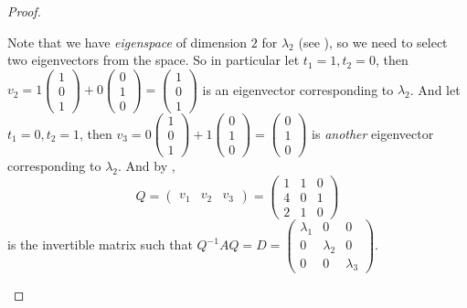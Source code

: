 \begin{proof}
\begin{enumerate}
Note that we have \emph{eigenspace} of dimension \(2\) for \(\lambda_2\) (see ), so we need to select two \LID{} eigenvectors from the space.
So in particular let \(t_1 = 1, t_2 = 0\), then \(v_2 = 1 \begin{pmatrix} 1 \\ 0 \\ 1 \end{pmatrix} + 0 \begin{pmatrix} 0 \\ 1 \\ 0 \end{pmatrix} = \begin{pmatrix} 1 \\ 0 \\ 1 \end{pmatrix}\) is an eigenvector corresponding to \(\lambda_2\).
And let \(t_1 = 0, t_2 = 1\), then \(v_3 = 0 \begin{pmatrix} 1 \\ 0 \\ 1 \end{pmatrix} + 1 \begin{pmatrix} 0 \\ 1 \\ 0 \end{pmatrix} = \begin{pmatrix} 0 \\ 1 \\ 0 \end{pmatrix}\) is \emph{another} eigenvector corresponding to \(\lambda_2\).
And by ,
\[
    Q = \begin{pmatrix} v_1 & v_2 & v_3 \end{pmatrix}
      = \begin{pmatrix}
            1 & 1 & 0 \\
            4 & 0 & 1 \\
            2 & 1 & 0
        \end{pmatrix}
\]
is the invertible matrix such that \(Q^{-1} A Q = D = \begin{pmatrix}
    \lambda_1 & 0 & 0 \\ 0 & \lambda_2 & 0 \\ 0 & 0 & \lambda_3 \end{pmatrix}\).
\end{enumerate}
\end{proof}


